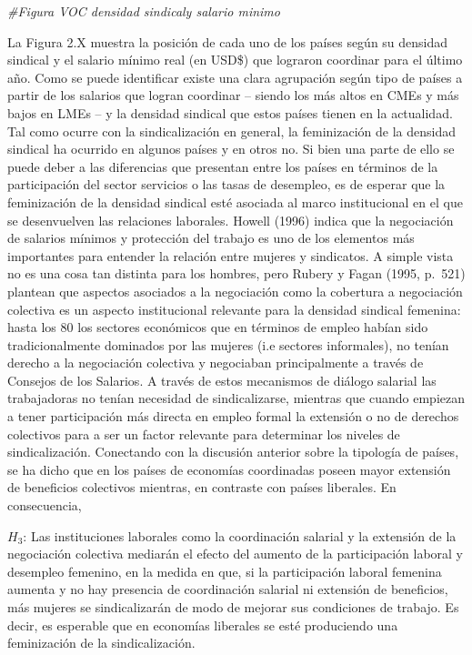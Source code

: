 \documentclass[
]{book}
\newenvironment{Shaded}{\begin{snugshade}}{\end{snugshade}}
\newcommand{\CommentTok}[1]{\textcolor[rgb]{0.56,0.35,0.01}{\textit{#1}}}
\begin{document}
\begin{Shaded}
\begin{Highlighting}[]
\CommentTok{#Figura VOC densidad sindicaly salario minimo}
\end{Highlighting}
\end{Shaded}

La Figura 2.X muestra la posición de cada uno de los países según su densidad sindical y el salario mínimo real (en USD\$) que lograron coordinar para el último año. Como se puede identificar existe una clara agrupación según tipo de países a partir de los salarios que logran coordinar -- siendo los más altos en CMEs y más bajos en LMEs -- y la densidad sindical que estos países tienen en la actualidad.
Tal como ocurre con la sindicalización en general, la feminización de la densidad sindical ha ocurrido en algunos países y en otros no. Si bien una parte de ello se puede deber a las diferencias que presentan entre los países en términos de la participación del sector servicios o las tasas de desempleo, es de esperar que la feminización de la densidad sindical esté asociada al marco institucional en el que se desenvuelven las relaciones laborales. Howell (1996) indica que la negociación de salarios mínimos y protección del trabajo es uno de los elementos más importantes para entender la relación entre mujeres y sindicatos. A simple vista no es una cosa tan distinta para los hombres, pero Rubery y Fagan (1995, p.~521) plantean que aspectos asociados a la negociación como la cobertura a negociación colectiva es un aspecto institucional relevante para la densidad sindical femenina: hasta los 80 los sectores económicos que en términos de empleo habían sido tradicionalmente dominados por las mujeres (i.e sectores informales), no tenían derecho a la negociación colectiva y negociaban principalmente a través de Consejos de los Salarios. A través de estos mecanismos de diálogo salarial las trabajadoras no tenían necesidad de sindicalizarse, mientras que cuando empiezan a tener participación más directa en empleo formal la extensión o no de derechos colectivos para a ser un factor relevante para determinar los niveles de sindicalización. Conectando con la discusión anterior sobre la tipología de países, se ha dicho que en los países de economías coordinadas poseen mayor extensión de beneficios colectivos mientras, en contraste con países liberales. En consecuencia,

\(H_{3}\): Las instituciones laborales como la coordinación salarial y la extensión de la negociación colectiva mediarán el efecto del aumento de la participación laboral y desempleo femenino, en la medida en que, si la participación laboral femenina aumenta y no hay presencia de coordinación salarial ni extensión de beneficios, más mujeres se sindicalizarán de modo de mejorar sus condiciones de trabajo. Es decir, es esperable que en economías liberales se esté produciendo una feminización de la sindicalización.
\end{document}
